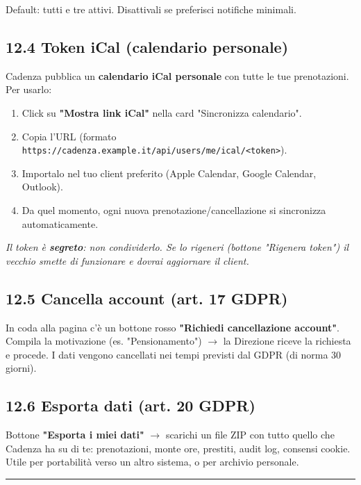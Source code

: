 \documentclass[11pt,a4paper]{article}
\renewenvironment{quote}
  {\begin{list}{}{%
      \setlength{\leftmargin}{8pt}%
      \setlength{\rightmargin}{8pt}%
      \setlength{\topsep}{6pt}%
      \setlength{\parsep}{0pt}}%
      \item\relax\color{black!75}\itshape}
  {\end{list}}
\begin{document}
Default: tutti e tre attivi. Disattivali se preferisci notifiche minimali.

\subsection{12.4 Token iCal (calendario personale)}


Cadenza pubblica un \textbf{calendario iCal personale} con tutte le tue prenotazioni. Per usarlo:

\begin{enumerate}
  \item Click su \textbf{"Mostra link iCal"} nella card "Sincronizza calendario".
  \item Copia l'URL (formato \texttt{https://cadenza.example.it/api/users/me/ical/\textless{}token\textgreater{}}).
  \item Importalo nel tuo client preferito (Apple Calendar, Google Calendar, Outlook).
  \item Da quel momento, ogni nuova prenotazione/cancellazione si sincronizza automaticamente.
\end{enumerate}

\begin{quote}
Il token è \textbf{segreto}: non condividerlo. Se lo rigeneri (bottone "Rigenera token") il vecchio smette di funzionare e dovrai aggiornare il client.
\end{quote}

\subsection{12.5 Cancella account (art. 17 GDPR)}


In coda alla pagina c'è un bottone rosso \textbf{"Richiedi cancellazione account"}. Compila la motivazione (es. "Pensionamento") $\rightarrow$ la Direzione riceve la richiesta e procede. I dati vengono cancellati nei tempi previsti dal GDPR (di norma 30 giorni).

\subsection{12.6 Esporta dati (art. 20 GDPR)}


Bottone \textbf{"Esporta i miei dati"} $\rightarrow$ scarichi un file ZIP con tutto quello che Cadenza ha su di te: prenotazioni, monte ore, prestiti, audit log, consensi cookie. Utile per portabilità verso un altro sistema, o per archivio personale.

\medskip\hrule\medskip
\end{document}
